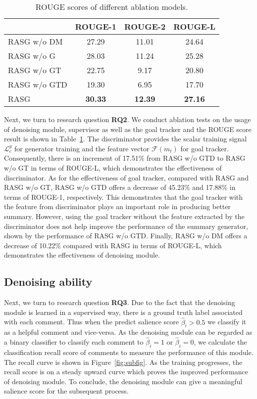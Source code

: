 \documentclass[letterpaper]{article} \usepackage{aaai19}  \usepackage{times}  \usepackage{helvet}  \usepackage{courier}
\begin{document}
\begin{table}[t]
\centering
\small
\caption{ROUGE scores of different ablation models.}
\begin{tabular}{@{}lcc c@{}}
\toprule
& ROUGE-1 & ROUGE-2 & ROUGE-L \\
\midrule
RASG w/o DM & 27.29 & 11.01 & 24.64 \\
RASG w/o G & 28.03 & 11.24 & 25.28 \\
RASG w/o GT & 22.75 & 9.17 & 20.80 \\
RASG w/o GTD & 19.30 & 6.95 & 17.70 \\
RASG & \textbf{30.33} & \textbf{12.39} & \textbf{27.16} \\
\bottomrule
\end{tabular}
\label{tab:comp_rouge_ablation}
\end{table}
Next, we turn to research question \textbf{RQ2}.
We conduct ablation tests on the usage of denoising module, supervisor as well as the goal tracker and the ROUGE score result is shown in Table~\ref{tab:comp_rouge_ablation}.
The discriminator provides the scalar training signal $\mathcal{L}_c^g$ for generator training and the feature vector $\mathcal{F}(m_t)$ for goal tracker.
Consequently, there is an increment of 17.51\% from RASG w/o GTD to RASG w/o GT in terms of ROUGE-L, which demonstrates the effectiveness of discriminator.
As for the effectiveness of goal tracker, compared with RASG and RASG w/o GT, RASG w/o GTD offers a decrease of 45.23\% and 17.88\% in terms of ROUGE-1, respectively. This demonstrates that the goal tracker with the feature from discriminator plays an important role in producing better summary.
However, using the goal tracker without the feature extracted by the discriminator does not help improve the performance of the summary generator, shown by the performance of RASG w/o GTD.
Finally, RASG w/o DM offers a decrease of 10.22\% compared with RASG in terms of ROUGE-L, which demonstrates the effectiveness of denoising module. 

\subsection{Denoising ability}

Next, we turn to research question \textbf{RQ3}.
Due to the fact that the denoising module is learned in a supervised way, there is a ground truth label associated with each comment.
Thus when the predict salience score $\hat{\beta}_i > 0.5$ we classify it as a helpful comment and vice-versa.
As the denoising module can be regarded as a binary classifier to classify each comment to $\hat{\beta}_i = 1$ or $\hat{\beta}_i = 0$, we calculate the classification recall score of comments to measure the performance of this module.
The recall curve is shown in Figure~\ref{fig:subfig}.
As the training progresses, the recall score is on a steady upward curve which proves the improved performance of denoising module.
To conclude, the denoising module can give a meaningful salience score for the subsequent process.
\end{document}
